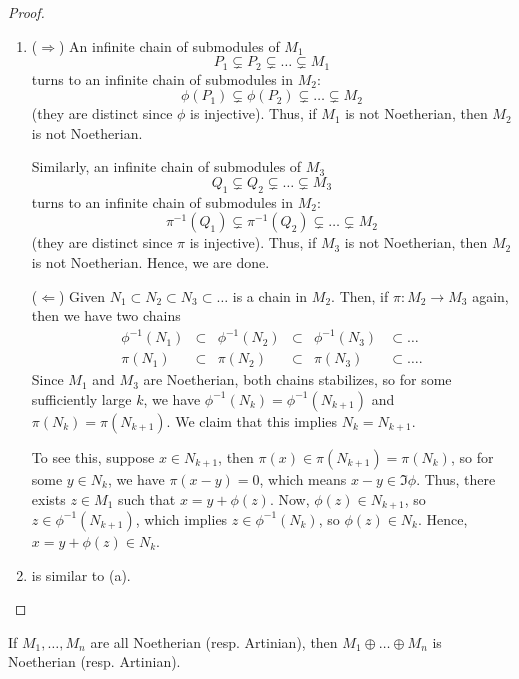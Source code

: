 \begin{proof}
    \begin{enumerate}[label=(\alph*)]
    \item ($\Rightarrow$)
    An infinite chain of submodules of $M_1$
    $$P_1 \subsetneq P_2 \subsetneq \dots \subsetneq M_1$$
    turns to an infinite chain of submodules in $M_2$:
    $$\phi(P_1) \subsetneq \phi(P_2) \subsetneq \dots \subsetneq M_2$$
    (they are distinct since $\phi$ is injective).
    Thus, if $M_1$ is not Noetherian, then $M_2$
    is not Noetherian.
    
    Similarly, an infinite chain of submodules of $M_3$
    $$Q_1 \subsetneq Q_2 \subsetneq \dots \subsetneq M_3$$
    turns to an infinite chain of submodules in $M_2$:
    $$\pi^{-1}(Q_1) \subsetneq \pi^{-1}(Q_2) \subsetneq \dots \subsetneq M_2$$
    (they are distinct since $\pi$ is injective).
    Thus, if $M_3$ is not Noetherian, then $M_2$
    is not Noetherian. Hence, we are done.
    
    ($\Leftarrow$)
    Given $N_1\subset N_2\subset N_3\subset\dots$
    is a chain in $M_2$.
    Then, if $\pi : M_2\to M_3$ again,
    then we have two chains
    $$
    \begin{array}{cccccl}
        \phi^{-1}(N_1)& \subset & \phi^{-1}(N_2)
        & \subset &  \phi^{-1}(N_3)
        & \subset\dots \\[4pt]
        \pi(N_1) & \subset  & \pi(N_2) & \subset &  \pi(N_3) & \subset\dots.
    \end{array}
    $$
    Since $M_1$ and $M_3$ are Noetherian,
    both chains stabilizes, so for some 
    sufficiently large $k$, we have
    $\phi^{-1}(N_k) = \phi^{-1}(N_{k+1})$
    and $\pi(N_k)=\pi(N_{k+1})$.
    We claim that this implies $N_k=N_{k+1}$.
    
    To see this, suppose $x\in N_{k+1}$, then
    $\pi(x)\in \pi(N_{k+1}) = \pi(N_k)$, 
    so for some $y\in N_k$, we have
    $\pi(x-y)=0$, which means $x-y\in \Im\phi$.
    Thus, there exists $z\in M_1$ such that $x=y+\phi(z)$.
    Now, $\phi(z)\in N_{k+1}$, so $z\in \phi^{-1}(N_{k+1})$,
    which implies $z\in \phi^{-1}(N_k)$, so $\phi(z)\in N_k$.
    Hence, $x = y+\phi(z) \in N_k$.
    \item is similar to (a). \qedhere
\end{enumerate}
\end{proof}
\begin{corollary}
    If $M_1,\dots,M_n$ are all Noetherian (resp. Artinian),
    then $M_1\oplus \dots\oplus M_n$ is Noetherian
    (resp. Artinian).
\end{corollary}
